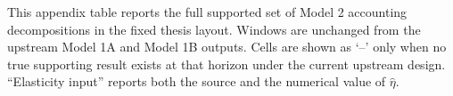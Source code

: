 \begin{table}[!htbp]
\begin{threeparttable}
\begin{tabularx}{\textwidth}
      \bottomrule
    \end{tabularx}

    \begin{tablenotes}[flushleft]
      \footnotesize
      \setlength{\parindent}{0pt}
      \item This appendix table reports the full supported set of Model 2 accounting decompositions in the fixed thesis layout. Windows are unchanged from the upstream Model 1A and Model 1B outputs. Cells are shown as `--' only when no true supporting result exists at that horizon under the current upstream design. “Elasticity input” reports both the source and the numerical value of $\hat{\eta}$.
    \end{tablenotes}
  \end{threeparttable}
\end{table}
